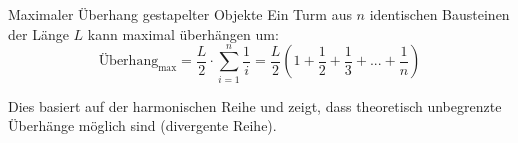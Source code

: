 \begin{example2}{Maximaler Überhang gestapelter Objekte}
    Ein Turm aus $n$ identischen Bausteinen der Länge $L$ kann maximal überhängen um:
    \begin{equation}
        \text{Überhang}_{\text{max}} = \frac{L}{2} \cdot \sum_{i=1}^{n} \frac{1}{i} = \frac{L}{2}(1 + \frac{1}{2} + \frac{1}{3} + ... + \frac{1}{n})
    \end{equation}
    
    Dies basiert auf der harmonischen Reihe und zeigt, dass theoretisch unbegrenzte Überhänge möglich sind (divergente Reihe).
\end{example2}